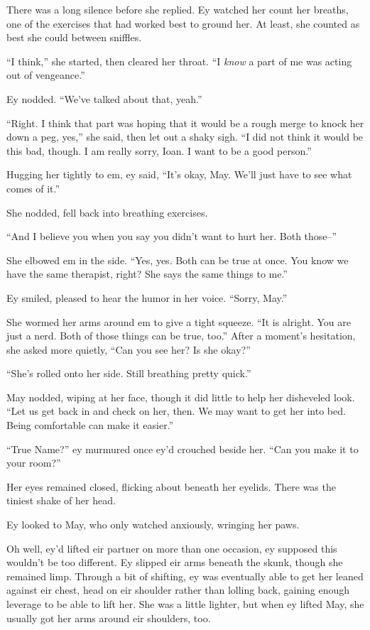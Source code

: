 There was a long silence before she replied. Ey watched her count her breaths, one of the exercises that had worked best to ground her. At least, she counted as best she could between sniffles.

``I think,'' she started, then cleared her throat. ``I \emph{know} a part of me was acting out of vengeance.''

Ey nodded. ``We've talked about that, yeah.''

``Right. I think that part was hoping that it would be a rough merge to knock her down a peg, yes,'' she said, then let out a shaky sigh. ``I did not think it would be this bad, though. I am really sorry, Ioan. I want to be a good person.''

Hugging her tightly to em, ey said, ``It's okay, May. We'll just have to see what comes of it.''

She nodded, fell back into breathing exercises.

``And I believe you when you say you didn't want to hurt her. Both those--''

She elbowed em in the side. ``Yes, yes. Both can be true at once. You know we have the same therapist, right? She says the same things to me.''

Ey smiled, pleased to hear the humor in her voice. ``Sorry, May.''

She wormed her arms around em to give a tight squeeze. ``It is alright. You are just a nerd. Both of those things can be true, too.'' After a moment's hesitation, she asked more quietly, ``Can you see her? Is she okay?''

``She's rolled onto her side. Still breathing pretty quick.''

May nodded, wiping at her face, though it did little to help her disheveled look. ``Let us get back in and check on her, then. We may want to get her into bed. Being comfortable can make it easier.''

``True Name?'' ey murmured once ey'd crouched beside her. ``Can you make it to your room?''

Her eyes remained closed, flicking about beneath her eyelids. There was the tiniest shake of her head.

Ey looked to May, who only watched anxiously, wringing her paws.

Oh well, ey'd lifted eir partner on more than one occasion, ey supposed this wouldn't be too different. Ey slipped eir arms beneath the skunk, though she remained limp. Through a bit of shifting, ey was eventually able to get her leaned against eir chest, head on eir shoulder rather than lolling back, gaining enough leverage to be able to lift her. She was a little lighter, but when ey lifted May, she usually got her arms around eir shoulders, too.

